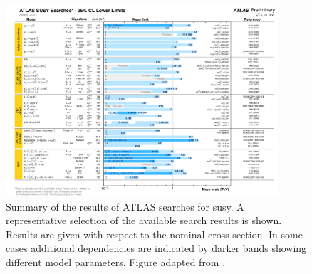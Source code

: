 \graphicspath{{chapter-results/Figs/Vector/}{chapter-results/Figs/}}


\begin{figure}
	\centering\includegraphics[width=0.9\textwidth]{susy_summary}
	\caption{Summary of the results of ATLAS searches for \gls{susy}. A representative selection of the available search results is shown. Results are given with respect to the nominal cross section. In some cases additional dependencies are indicated by darker bands showing different model parameters. Figure adapted from \cite{ATL-PHYS-PUB-2021-007}.}
	\label{fig:susy_summary_plot}
\end{figure}



